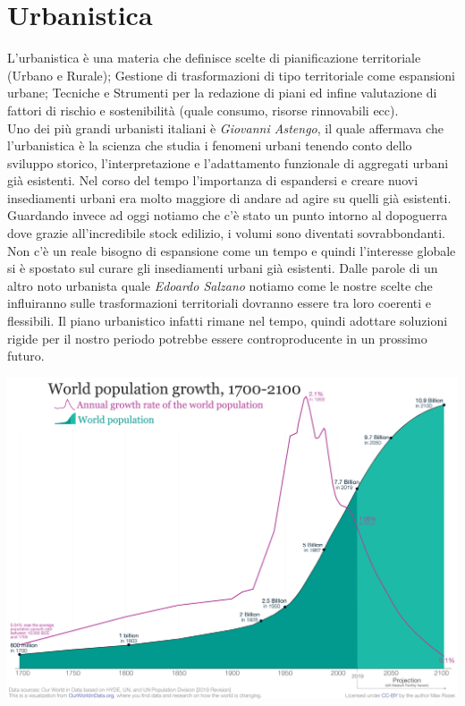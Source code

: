 \documentclass[a4paper,12pt, oneside]{book}
\begin{document}
	\section{Urbanistica}
	L'urbanistica è una materia che definisce scelte di pianificazione territoriale (Urbano e Rurale); Gestione di trasformazioni di tipo territoriale come espansioni urbane; Tecniche e Strumenti per la redazione di piani ed infine valutazione di fattori di rischio e sostenibilità (quale consumo, risorse rinnovabili ecc).\\
	Uno dei più grandi urbanisti italiani è \textit{Giovanni Astengo}, il quale affermava che l'urbanistica è la scienza che studia i fenomeni urbani tenendo conto dello sviluppo storico, l'interpretazione e l'adattamento funzionale di aggregati urbani già esistenti.\newline
	Nel corso del tempo l'importanza di espandersi e creare nuovi insediamenti urbani era molto maggiore di andare ad agire su quelli già esistenti. Guardando invece ad oggi notiamo che c'è stato un punto intorno al dopoguerra dove grazie all'incredibile stock edilizio, i volumi sono diventati sovrabbondanti. Non c'è un reale bisogno di espansione come un tempo e quindi l'interesse globale si è spostato sul curare gli insediamenti urbani già esistenti.\newline
	Dalle parole di un altro noto urbanista quale \textit{Edoardo Salzano} notiamo come le nostre scelte che influiranno sulle trasformazioni territoriali dovranno essere tra loro coerenti e flessibili. Il piano urbanistico infatti rimane nel  tempo, quindi adottare soluzioni rigide per il nostro periodo potrebbe essere controproducente in un prossimo futuro.
	\leavevmode\\
	\begin{center}
		\includegraphics[width=0.7\linewidth]{"Immagini/2019-World-Population-Growth-1700-2100"}
	\end{center}
\end{document}
